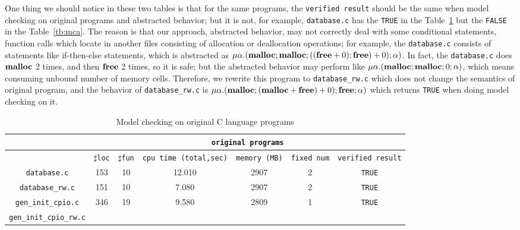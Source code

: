 One thing we should notice in these two tables is that for the same
programs, the \texttt{verified result} should be the same when model
checking on original programs and abstracted behavior; but it is not,
for example, \texttt{database.c} has the \texttt{TRUE} in the
Table~\ref{tb:mcc} but the \texttt{FALSE} in the
Table~\ref{tb:mca}. The reason is that our approach, abstracted
behavior, may not correctly deal with some conditional statements,
function calls which locate in another files consisting of allocation
or deallocation operations; for example, the \texttt{database.c}
consists of statements like if-then-else statements, which is
abstracted as $\mu\alpha.(\mathbf{malloc};\mathbf{malloc};((\mathbf{free} + 0);\mathbf{free}) +
0);\alpha)$. In fact, the \texttt{database.c} does $\mathbf{malloc}$ 2 times,
and then $\mathbf{free}$ 2 times, so it is safe; but the abstracted behavior
may perform like $\mu\alpha.(\mathbf{malloc};\mathbf{malloc};0;\alpha)$, which means
consuming unbound number of memory cells. Therefore, we rewrite this
program to \texttt{database\_rw.c} which does not change the semantics
of original program, and the behavior of \texttt{database\_rw.c} is
$\mu\alpha.(\mathbf{malloc};(\mathbf{malloc} + \mathbf{free}) + 0);\mathbf{free};\alpha)$ which
returns \texttt{TRUE} when doing model checking on it.

\begin{table}
  \scriptsize
\begin{tabular}{|c|c|c|c|c|c|c|}
\hline
& \multicolumn{6}{|c|}{\texttt{original programs}}  \\
\hline
 & $\sharp$\texttt{loc} & $\sharp$\texttt{fun} & \texttt{cpu time (total,sec)} & \texttt{memory (MB)} & \texttt{fixed num}& \texttt{verified result} \\
\hline
\texttt{database.c} & 153 & 10 & 12.010 & 2907 & 2  & \texttt{TRUE}  \\
\hline
\texttt{database\_rw.c} & 151 & 10 & 7.080 & 2907 & 2  & \texttt{TRUE}  \\
\hline
\texttt{gen\_init\_cpio.c} & 346 & 19 & 9.580 & 2809 & 1  & \texttt{TRUE}  \\
\hline
\texttt{gen\_init\_cpio\_rw.c} &  &  &  &  &   & \texttt{}  \\

\hline
\end{tabular}
\caption{Model checking on original C language programs}
\label{tb:mcc}
\end{table}

